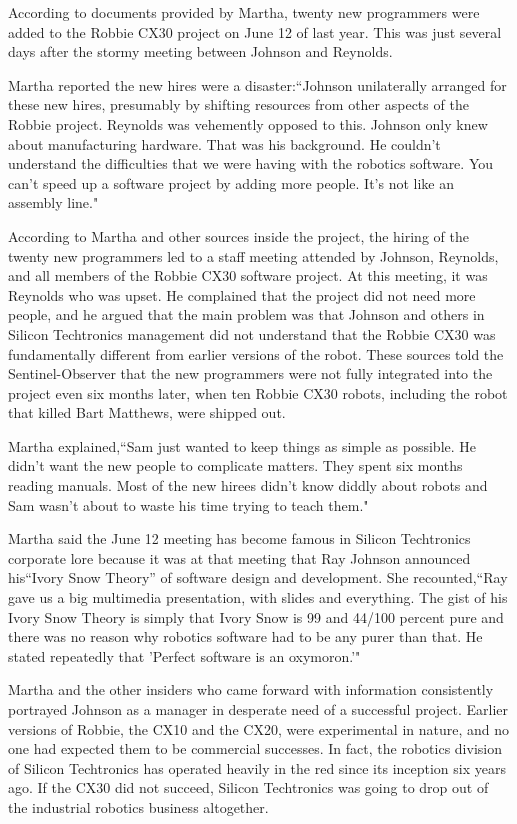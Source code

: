 According to documents provided by Martha, twenty new programmers were added to the Robbie CX30 project on June 12 of last year. This was just several days after the stormy meeting between Johnson and Reynolds.

Martha reported the new hires were a disaster:``Johnson unilaterally arranged for these new hires, presumably by shifting resources from other aspects of the Robbie project. Reynolds was vehemently opposed to this. Johnson only knew about manufacturing hardware. That was his background. He couldn't understand the difficulties that we were having with the robotics software. You can't speed up a software project by adding more people. It's not like an assembly line."

According to Martha and other sources inside the project, the hiring of the twenty new programmers led to a staff meeting attended by Johnson, Reynolds, and all members of the Robbie CX30 software project. At this meeting, it was Reynolds who was upset. He complained that the project did not need more people, and he argued that the main problem was that Johnson and others in Silicon Techtronics management did not understand that the Robbie CX30 was fundamentally different from earlier versions of the robot. These sources told the Sentinel-Observer that the new programmers were not fully integrated into the project even six months later, when ten Robbie CX30 robots, including the robot that killed Bart Matthews, were shipped out.

Martha explained,``Sam just wanted to keep things as simple as possible. He didn't want the new people to complicate matters. They spent six months reading manuals. Most of the new hirees didn't know diddly about robots and Sam wasn't about to waste his time trying to teach them."

Martha said the June 12 meeting has become famous in Silicon Techtronics corporate lore because it was at that meeting that Ray Johnson announced his``Ivory Snow Theory'' of software design and development. She recounted,``Ray gave us a big multimedia presentation, with slides and everything. The gist of his Ivory Snow Theory is simply that Ivory Snow is 99 and 44/100 percent pure and there was no reason why robotics software had to be any purer than that. He stated repeatedly that 'Perfect software is an oxymoron.'"

Martha and the other insiders who came forward with information consistently portrayed Johnson as a manager in desperate need of a successful project. Earlier versions of Robbie, the CX10 and the CX20, were experimental in nature, and no one had expected them to be commercial successes. In fact, the robotics division of Silicon Techtronics has operated heavily in the red since its inception six years ago. If the CX30 did not succeed, Silicon Techtronics was going to drop out of the industrial robotics business altogether.

